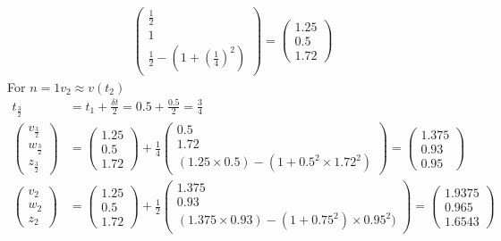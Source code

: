 \documentclass[12pt,a4paper]{article}
\begin{document}
\begin{enumerate}
\begin{align*}
\begin{pmatrix}
    \frac{1}{2}\\
    1\\
    \frac{1}{2}   -  ( 1 + (\frac{1}{4})^2)
  \end{pmatrix} =  \begin{pmatrix}
  1.25\\
  0.5\\
  1.72
  \end{pmatrix}
\end{align*}
For $ n  =  1  v_2 \approx  v(t_2)  $
\begin{align*}
    t_{ \frac{3}{2}}    &=  t_1 + \frac{\delta  t}{  2}    =  0.5   + \frac{0.5}{2}   =  \frac{3}{4}\\
\begin{pmatrix}
      v_{ \frac{3}{2}}  \\
     w _{ \frac{3}{2}} \\
     z_{ \frac{3}{2}} 
\end{pmatrix}  &=  \begin{pmatrix}
     1.25\\
     0.5\\
     1.72
\end{pmatrix} + \frac{1}{4}  \begin{pmatrix}
     0.5\\
     1.72\\
     (1.25 \times 0.5)   -  ( 1 + 0.5^2  \times 1.72^2) 
\end{pmatrix} =  \begin{pmatrix}
     1.375\\
     0.93\\
     0.95
\end{pmatrix}\\
\begin{pmatrix}
    v_2\\
    w_2\\
    z_2
\end{pmatrix} &=  \begin{pmatrix}
     1.25\\
     0.5\\
     1.72
\end{pmatrix} + \frac{1}{2}  \begin{pmatrix}
1.375\\
0.93\\
(1.375 \times 0.93)  -  (1 + 0.75^2) \times 0.95^2)
\end{pmatrix} =  \begin{pmatrix}
    1.9375\\
    0.965\\
    1.6543
\end{pmatrix}
\end{align*}
\end{enumerate}
\end{document}
